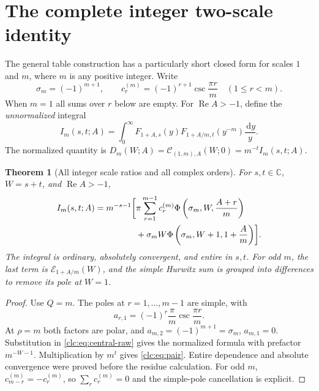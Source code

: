 \documentclass[11pt,a4paper]{article}
\numberwithin{equation}{section}
\newtheorem{theorem}{Theorem}[section]
\theoremstyle{definition}\newtheorem{definition}[theorem]{Definition}
\theoremstyle{remark}\newtheorem{remark}[theorem]{Remark}
\DeclareMathOperator{\Rea}{Re}
\newcommand{\dd}{\,\mathrm d}
\newcommand{\C}{\mathbb C}\newcommand{\R}{\mathbb R}\newcommand{\N}{\mathbb N}
\newcommand{\CC}{\mathcal C}\newcommand{\UU}{\mathcal U}\newcommand{\EE}{\mathcal E}
\begin{document}
\section{The complete integer two-scale identity}
\label{clc:sec:two}

The general table construction has a particularly short closed form
for scales $1$ and $m$, where $m$ is any positive integer. Write
\begin{equation}\label{clc:eq:pair-data}
 \sigma_m=(-1)^{m+1},\qquad
 c_r^{(m)}=(-1)^{r+1}\csc\frac{\pi r}{m}\quad(1\le r<m).
\end{equation}
When $m=1$ all sums over $r$ below are empty.
For $\Rea A>-1$, define the \emph{unnormalized} integral
\begin{equation}\label{clc:eq:I-def}
 I_m(s,t;A)=\int_0^\infty
 F_{1+A,s}(y)F_{1+A/m,t}(y^{-m})\frac{\dd y}{y}.
\end{equation}
The normalized quantity is
$D_m(W;A)=\CC_{(1,m),A}(W;0)=m^{-t}I_m(s,t;A)$.

\begin{theorem}[All integer scale ratios and all complex orders]
\label{clc:thm:pair}
For $s,t\in\C$, $W=s+t$, and $\Rea A>-1$,
\begin{align}
 I_m(s,t;A)=m^{-s-1}\biggl[&
 \pi\sum_{r=1}^{m-1}c_r^{(m)}
       \Phi\left(\sigma_m,W,\frac{A+r}{m}\right)\notag\\
 &+\sigma_m W\Phi\left(\sigma_m,W+1,1+\frac A m\right)\biggr].
 \label{clc:eq:pair}
\end{align}
The integral is ordinary, absolutely convergent, and entire in $s,t$.
For odd $m$, the last term is $\EE_{1+A/m}(W)$, and the simple Hurwitz
sum is grouped into differences to remove its pole at $W=1$.
\end{theorem}
\begin{proof}
Use $Q=m$. The poles at $r=1,\ldots,m-1$ are simple, with
\[
 a_{r,1}=(-1)^r\frac\pi m\csc\frac{\pi r}{m}.
\]
At $\rho=m$ both factors are polar, and
$a_{m,2}=(-1)^{m+1}=\sigma_m$, $a_{m,1}=0$.
Substitution in \eqref{clc:eq:central-raw} gives the normalized formula
with prefactor $m^{-W-1}$. Multiplication by $m^t$ gives
\eqref{clc:eq:pair}. Entire dependence and absolute convergence were
proved before the residue calculation. For odd $m$,
$c_{m-r}^{(m)}=-c_r^{(m)}$, so $\sum_rc_r^{(m)}=0$ and the
simple-pole cancellation is explicit.
\end{proof}
\end{document}
